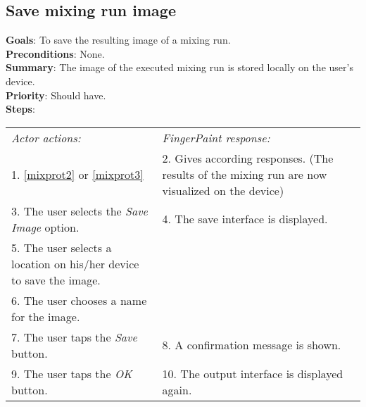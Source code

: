 \begin{appendices}
\section{Save mixing run image}
  \label{savemiximage}
  \textbf{Goals}: To save the resulting image of a mixing run.\\
  \textbf{Preconditions}: None.\\
  \textbf{Summary}: The image of the executed mixing run is stored locally on the user's device.\\
  \textbf{Priority}: Should have.\\
  \textbf{Steps}: \\
  \begin{tabular}{ p{} p{} }
  	\emph{Actor actions:} & \emph{FingerPaint response:} \\
        1. \ref{mixprot2} or \ref{mixprot3} & 2. Gives according responses. (The results of the mixing run are now visualized  on the device) \\	
	 3. The user selects the \emph{Save Image} option. & 4. The save interface is displayed.\\
	 5. The user selects a location on his/her device to save the image. & \\
	 6. The user chooses a name for the image. & \\
	 7. The user taps the \emph{Save} button. & 8. A confirmation message is shown. \\
	 9. The user taps the \emph{OK} button. & 10. The output interface is displayed again. \\
  \end{tabular}


\end{appendices}
